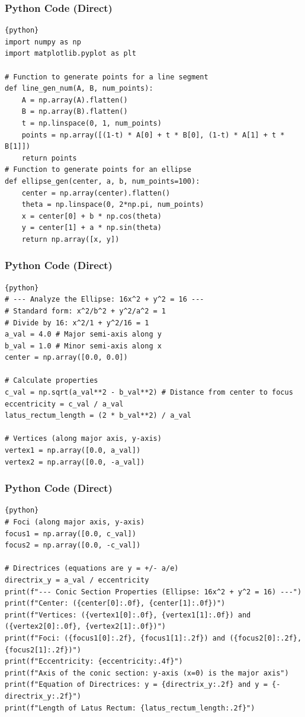 \documentclass{beamer}
\begin{document}
\begin{frame}[fragile]
\frametitle{Python Code (Direct)}
\begin{lstlisting}{python}
import numpy as np
import matplotlib.pyplot as plt

# Function to generate points for a line segment
def line_gen_num(A, B, num_points):
    A = np.array(A).flatten()
    B = np.array(B).flatten()
    t = np.linspace(0, 1, num_points)
    points = np.array([(1-t) * A[0] + t * B[0], (1-t) * A[1] + t * B[1]])
    return points
# Function to generate points for an ellipse
def ellipse_gen(center, a, b, num_points=100):
    center = np.array(center).flatten()
    theta = np.linspace(0, 2*np.pi, num_points)
    x = center[0] + b * np.cos(theta)
    y = center[1] + a * np.sin(theta)
    return np.array([x, y])
\end{lstlisting}
\end{frame}

\begin{frame}[fragile]
\frametitle{Python Code (Direct)}
\begin{lstlisting}{python}
# --- Analyze the Ellipse: 16x^2 + y^2 = 16 ---
# Standard form: x^2/b^2 + y^2/a^2 = 1
# Divide by 16: x^2/1 + y^2/16 = 1
a_val = 4.0 # Major semi-axis along y
b_val = 1.0 # Minor semi-axis along x
center = np.array([0.0, 0.0])

# Calculate properties
c_val = np.sqrt(a_val**2 - b_val**2) # Distance from center to focus
eccentricity = c_val / a_val
latus_rectum_length = (2 * b_val**2) / a_val

# Vertices (along major axis, y-axis)
vertex1 = np.array([0.0, a_val])
vertex2 = np.array([0.0, -a_val])
\end{lstlisting}
\end{frame}

\begin{frame}[fragile]
\frametitle{Python Code (Direct)}
\begin{lstlisting}{python}
# Foci (along major axis, y-axis)
focus1 = np.array([0.0, c_val])
focus2 = np.array([0.0, -c_val])

# Directrices (equations are y = +/- a/e)
directrix_y = a_val / eccentricity
print(f"--- Conic Section Properties (Ellipse: 16x^2 + y^2 = 16) ---")
print(f"Center: ({center[0]:.0f}, {center[1]:.0f})")
print(f"Vertices: ({vertex1[0]:.0f}, {vertex1[1]:.0f}) and ({vertex2[0]:.0f}, {vertex2[1]:.0f})")
print(f"Foci: ({focus1[0]:.2f}, {focus1[1]:.2f}) and ({focus2[0]:.2f}, {focus2[1]:.2f})")
print(f"Eccentricity: {eccentricity:.4f}")
print(f"Axis of the conic section: y-axis (x=0) is the major axis")
print(f"Equation of Directrices: y = {directrix_y:.2f} and y = {-directrix_y:.2f}")
print(f"Length of Latus Rectum: {latus_rectum_length:.2f}")
\end{lstlisting}
\end{frame}
\end{document}
